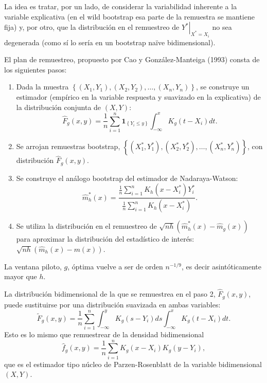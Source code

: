 \documentclass[
]{book}
\renewcommand{\mathbf}[1]{\symbf{#1}}
\theoremstyle{break}
\theoremstyle{nonumberplain}
\begin{document}
La idea es tratar, por un lado, de considerar la variabilidad inherente
a la variable explicativa (en el wild bootstrap esa parte de la
remuestra se mantiene fija) y, por otro, que la distribución en el
remuestreo de \(\left. Y^{\ast}\right\vert _{X^{\ast}=X_i}\) no sea
degenerada (como sí lo sería en un bootstrap naïve bidimensional).

El plan de remuestreo, propuesto por Cao y González-Manteiga (1993)
consta de los siguientes pasos:

\begin{enumerate}
\def\labelenumi{\arabic{enumi}.}
\item
  Dada la muestra \(\left\{ \left( X_1,Y_1 \right),\left(
  X_2,Y_2 \right),\ldots ,\left( X_n,Y_n \right) \right\}\), se
  construye un estimador (empírico en la variable respuesta y
  suavizado en la explicativa) de la distribución conjunta de
  \(\left( X,Y \right)\):
  \[\hat{F}_{g}\left( x,y \right) =\frac{1}{n}\sum_{i=1}^{n}\mathbf{1}_{\left\{
  Y_i\leq y\right\} }\int_{-\infty }^{x}K_{g}\left( t-X_i \right) dt.\]
\item
  Se arrojan remuestras bootstrap, \(\left\{ \left( X_1^{\ast
  },Y_1^{\ast} \right),\left( X_2^{\ast},Y_2^{\ast} \right),\ldots
  ,\left( X_n^{\ast},Y_n^{\ast} \right) \right\}\), con
  distribución
  \(\hat{F}_{g}\left( x,y \right)\).
\item
  Se construye el análogo bootstrap del estimador de Nadaraya-Watson:
  \[\hat{m}_{h}^{\ast}\left( x \right) =\frac{\frac{1}{n}\sum_{i=1}^{n}K_{h}
  \left( x-X_i^{\ast} \right) Y_i^{\ast}}{\frac{1}{n}\sum_{i=1}^{n}K_{h}
  \left( x-X_i^{\ast} \right)}.\]
\item
  Se utiliza la distribución en el remuestreo de \(\sqrt{nh}\left(
  \hat{m}_{h}^{\ast}\left( x \right) -\hat{m}_{g}\left( x \right) \right)\)
  para aproximar la distribución del estadístico de interés:
  \(\sqrt{nh}\left( \hat{m}_{h}\left( x \right) -m\left( x \right) \right)\).
\end{enumerate}

La ventana piloto, \(g\), óptima vuelve a ser de orden \(n^{-1/9}\), es
decir asintóticamente mayor que \(h\).

La distribución bidimensional de la que se remuestrea en el paso 2,
\(\hat{F}_{g}\left( x,y \right)\), puede sustituirse por una distribución
suavizada en ambas variables:
\[\tilde{F}_{g}\left( x,y \right) =\frac{1}{n}\sum_{i=1}^{n}
\int_{-\infty}^{y}K_{g}\left( s-Y_i \right) ds \int_{-\infty }^{x}
K_{g}\left( t-X_i \right) dt.\]
Esto es lo mismo que remuestrear de la densidad bidimensional
\[\hat{f}_{g}\left( x,y \right) = \frac{1}{n}\sum_{i=1}^{n}
K_{g}\left( x-X_i \right) K_{g}\left( y-Y_i \right),\]
que es el estimador tipo
núcleo de Parzen-Rosenblatt de la variable bidimensional
\(\left( X,Y \right)\).
\end{document}
